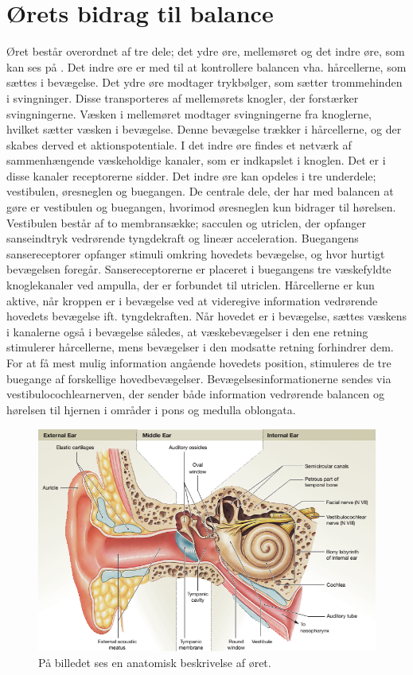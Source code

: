 \section{Ørets bidrag til balance}
Øret består overordnet af tre dele; det ydre øre, mellemøret og det indre øre, som kan ses på . Det indre øre er med til at kontrollere balancen vha. hårcellerne, som sættes i bevægelse. Det ydre øre modtager trykbølger, som sætter trommehinden i svingninger. Disse transporteres af mellemørets knogler, der forstærker svingningerne. Væsken i mellemøret modtager svingningerne fra knoglerne, hvilket sætter væsken i bevægelse. Denne bevægelse trækker i hårcellerne, og der skabes derved et aktionspotentiale. I det indre øre findes et netværk af sammenhængende væskeholdige kanaler, som er indkapslet i knoglen. Det er i disse kanaler receptorerne sidder. Det indre øre kan opdeles i tre underdele; vestibulen, øresneglen og buegangen. De centrale dele, der har med balancen at gøre er vestibulen og buegangen, hvorimod øresneglen kun bidrager til hørelsen.\cite{Martini2012}  \\
Vestibulen består af to membransække; sacculen og utriclen, der opfanger sanseindtryk vedrørende tyngdekraft og lineær acceleration. Buegangens sansereceptorer opfanger stimuli omkring hovedets bevægelse, og hvor hurtigt bevægelsen foregår. Sansereceptorerne er placeret i buegangens tre væskefyldte knoglekanaler ved ampulla, der er forbundet til utriclen. Hårcellerne er kun aktive, når kroppen er i bevægelse ved at videregive information vedrørende hovedets bevægelse ift. tyngdekraften. Når hovedet er i bevægelse, sættes væskens i kanalerne også i bevægelse således, at væskebevægelser i den ene retning stimulerer hårcellerne, mens bevægelser i den modsatte retning forhindrer dem. For at få mest mulig information angående hovedets position, stimuleres de tre buegange af forskellige hovedbevægelser. Bevægelsesinformationerne sendes via vestibulocochlearnerven, der sender både information vedrørende balancen og hørelsen til hjernen i områder i pons og medulla oblongata. \cite{Martini2012}    

\begin{figure}[H]
	\centering
	\includegraphics[scale=0.2]{figures/bProblemanalyse/Oerets-anatomi.jpg}
	\caption{På billedet ses en anatomisk beskrivelse af øret. \cite{Martini2012}}
	\label{Oeret}
\end{figure}

